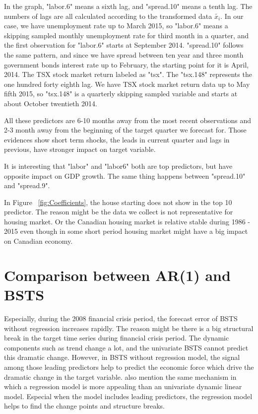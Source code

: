 In the graph, "labor.6" means a sixth lag, and "spread.10" means a tenth lag. The numbers of lags are all calculated according to the transformed data $\tilde{x_i}$. In our case, we have unemployment rate up to March 2015, so "labor.6" means a skipping sampled monthly unemployment rate for third month in a quarter, and the first observation for "labor.6" starts at September 2014. "spread.10" follows the same pattern, and since we have spread between ten year and three month government bonds interest rate up to February, the starting point for it is April, 2014. The TSX stock market return labeled as "tsx". The "tsx.148" represents the one hundred forty eighth lag. We have TSX stock market return data up to May fifth 2015, so "tsx.148" is a quarterly skipping sampled variable and starts at about October twentieth 2014. 

All these predictors are 6-10 months away from the most recent observations and 2-3 month away from the beginning of the target quarter we forecast for. Those evidences show short term shocks, the leads in current quarter and lags in previous, have stronger impact on target variable.

It is interesting that "labor" and "labor6" both are top predictors, but have opposite impact on GDP growth. The same thing happens between "spread.10" and "spread.9". 




In Figure ~\ref{fig:Coefficients}, the house starting does not show in the top 10 predictor. The reason might be the data we collect is not representative for housing market. Or the Canadian housing market is relative stable during 1986 - 2015 even though in some short period housing market might have a big impact on Canadian economy. 


 









\section{Comparison between AR(1) and BSTS}



Especially, during the 2008 financial crisis period, the forecast error of BSTS without regression increases rapidly.  The reason might be  there is a big structural break in the target time series during financial crisis period. The dynamic components such as trend change a lot, and the univariate BSTS cannot predict this dramatic change. However, in BSTS without regression model, the signal among those leading predictors help to predict the economic force which drive the dramatic change in the target variable.  also mention the same mechanism in which a regression model is more appealing than an univariate dynamic linear model. Especial when the model includes leading predictors, the regression model helps to find the change points and structure breaks.

